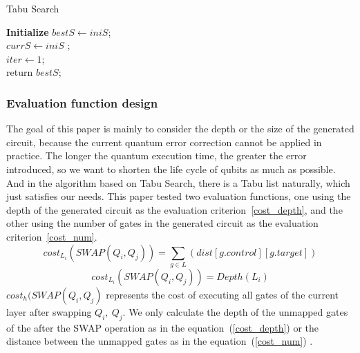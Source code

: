 \documentclass[runningheads]{llncs}
\begin{document}
			\begin{algorithm} 
			\label{algorithm_Tabu}
				\caption{Tabu Search }  
				\LinesNumbered  
				\textbf{Initialize}
					$bestS  \leftarrow iniS$; \\
					$currS \leftarrow iniS$ ;\\
					$iter \leftarrow 1$;\\
				return $bestS$;
				\end{algorithm}
\subsubsection{Evaluation function design }
The goal of this paper is mainly to consider the depth or the size of the generated circuit,
because the current quantum error correction cannot be applied in practice. 
The longer the quantum execution time, the greater the error introduced, 
so we want to shorten the life cycle of qubits as much as possible.
And in the algorithm based on Tabu Search, there is a Tabu list naturally, which just satisfies our needs.
This paper tested two evaluation functions, 
one using the depth of the generated circuit as the evaluation criterion~\ref{cost_depth}, 
and the other using the number of gates in the generated circuit as the evaluation criterion~\ref{cost_num}.
\begin{equation}
	cost_{L_{i}}(SWAP(Q_{i},Q_{j}))= \sum_{g \in L}(dist[g.control][g.target])
	\label{cost_num}
	\end{equation}
	\begin{equation}
		cost_{L_{i}}(SWAP(Q_{i},Q_{j}))= Depth(L_{i})
		\label{cost_depth}
		\end{equation}
$cost_{h}(SWAP(Q_{i},Q_{j})$ represents the cost of executing all gates of the current layer 
after swapping $Q_{i}, \ Q_{j}$.
We only calculate the depth of the unmapped gates of the after the SWAP operation as in the equation~(\ref{cost_depth})
 or the distance between the unmapped gates as in the equation~(\ref{cost_num}) .
\end{document}
